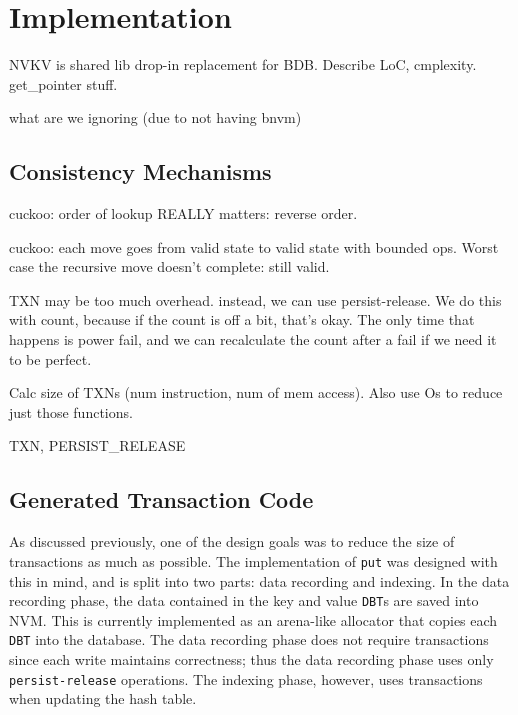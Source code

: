 \section{Implementation}

NVKV is shared lib drop-in replacement for BDB.
Describe LoC, cmplexity.
get\_pointer stuff.

what are we ignoring (due to not having bnvm)


\subsection{Consistency Mechanisms}

cuckoo:
order of lookup REALLY matters: reverse order.




cuckoo: each move goes from valid state to valid state with bounded
ops. Worst case the recursive move doesn't complete: still valid.

TXN may be too much overhead. instead, we can use persist-release. We do this
with count, because if the count is off a bit, that's okay. The only time that
happens is power fail, and we can recalculate the count after a fail if we need
it to be perfect.



Calc size of TXNs (num instruction, num of mem access). Also use Os to reduce just
those functions.


TXN, PERSIST\_RELEASE

\subsection{Generated Transaction Code}

As discussed previously, one of the design goals was to reduce the size of
transactions as much as possible. The implementation of \texttt{put} was
designed with this in mind, and is split into two parts: data recording and
indexing. In the data recording phase, the data contained in the key and value
\texttt{DBT}s are saved into NVM. This is currently implemented as an arena-like
allocator that copies each \texttt{DBT} into the database. The data recording
phase does not require transactions since each write maintains correctness; thus
the data recording phase uses only \texttt{persist-release} operations. The
indexing phase, however, uses transactions when updating the hash table.

